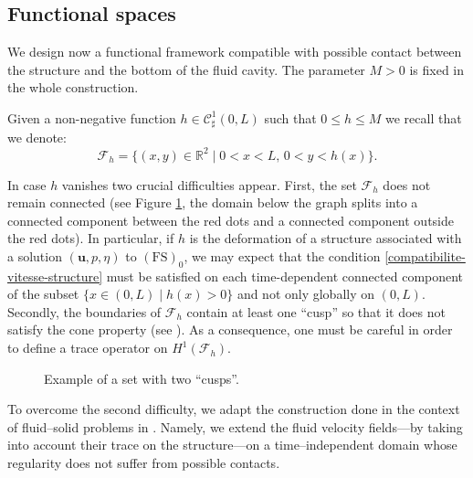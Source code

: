 \documentclass[11pt]{article}
\newcommand{\smaller}{\small}
\let\mathcal\mathscr
\newcommand{\FS}{\mathrm{FS}}
\theoremstyle{remark}
\theoremstyle{definition}
\newcommand{\ug}{\boldsymbol{u}}
\begin{document}
\subsection{Functional spaces}
We design now a functional framework compatible with possible contact between the structure and the bottom of the fluid cavity. The param\-e\-ter $M > 0$ is fixed in the whole construction.

Given a non-negative function $h \in \mathcal{C}^{1}_{\sharp}(0,L)$ such that $0\leq h \leq M$ we recall that we denote:
\[
\mathcal{F}_{h}=\{(x,y)\in\mathbb{R}^{2}\mid 0<x<L,\,0<y<h(x)\}.
\]

In case $h$ vanishes two crucial difficulties appear.
First, the set $\mathcal{F}_{h}$ does not remain connected (see Figure \ref{fig_cusp}, the domain below the graph splits into a connected component between the red dots and a connected component outside the red dots). In particular, if $h$ is the deformation of a structure associated with a solution $(\ug,p,\eta)$ to
$(\FS)_0$, we may expect that the condition \eqref{compatibilite-vitesse-structure} must be satisfied on each time-dependent connected component of the subset $\{x \in (0, L)\mid h(x) >0\}$ and not only globally on $(0,L)$.
Secondly, the boundaries of $\mathcal{F}_{h}$ contain at least one ``cusp'' so that it does not satisfy the cone property (see \cite{Adams}). As a consequence, one must be careful in order to define a trace operator on $H^{1}(\mathcal F_h)$.

\begin{figure}[!ht]
\centering\smaller
{}
\vspace*{-\baselineskip}
\caption{Example of a set with two ``cusps''. \label{fig_cusp}}
\end{figure}

To overcome the second difficulty, we adapt the construction done in the context of fluid--solid problems in \cite{SanMartin-Starovoitov-Tucsnak}. Namely, we extend the fluid velocity fields---by taking into account their trace on the structure---on a time--independent domain whose regularity does not suffer from possible contacts.
\end{document}
